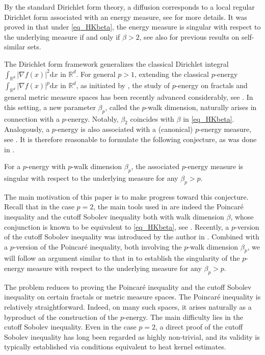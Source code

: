 \documentclass[11pt,a4paper]{article}
\numberwithin{equation}{section}
\theoremstyle{plain}
\theoremstyle{definition}
\begin{document}
By the standard Dirichlet form theory, a diffusion corresponds to a local regular Dirichlet form associated with an energy measure, see \cite{FOT11} for more details. It was proved in \cite{KM20} that under \ref{eq_HKbeta}, the energy measure is singular with respect to the underlying measure if and only if $\beta>2$, see also \cite{Kus89,Kus93LNM,BST99,Hin05,HN06} for previous results on self-similar sets.

The Dirichlet form framework generalizes the classical Dirichlet integral $\int_{\mathbb{R}^d}|\nabla f(x)|^2\mathrm{d} x$ in $\mathbb{R}^d$. For general $p>1$, extending the classical $p$-energy $\int_{\mathbb{R}^d}|\nabla f(x)|^p\mathrm{d} x$ in $\mathbb{R}^d$, as initiated by \cite{HPS04}, the study of $p$-energy on fractals and general metric measure spaces has been recently advanced considerably, see \cite{CGQ22,Shi24,BC23,MS25,Kig23,CGYZ26,AB25,AES25a}. In this setting, a new parameter $\beta_p$, called the $p$-walk dimension, naturally arises in connection with a $p$-energy. Notably, $\beta_2$ coincides with $\beta$ in \ref{eq_HKbeta}. Analogously, a $p$-energy is also associated with a (canonical) $p$-energy measure, see \cite{Sas26}. It is therefore reasonable to formulate the following conjecture, as was done in \cite[Problem 10.5]{MS25}.

\vspace{5pt}
 For a $p$-energy with $p$-walk dimension $\beta_p$, the associated $p$-energy measure is singular with respect to the underlying measure for any $\beta_p>p$.
\vspace{5pt}

The main motivation of this paper is to make progress toward this conjecture. Recall that in the case $p=2$, the main tools used in \cite{KM20} are indeed the Poincar\'e inequality and the cutoff Sobolev inequality both with walk dimension $\beta$, whose conjunction is known to be equivalent to \ref{eq_HKbeta}, see \cite{GHL15}. Recently, a $p$-version of the cutoff Sobolev inequality was introduced by the author in \cite{Yan25a}. Combined with a $p$-version of the Poincar\'e inequality, both involving the $p$-walk dimension $\beta_p$, we will follow an argument similar to that in \cite{KM20} to establish the singularity of the $p$-energy measure with respect to the underlying measure for any $\beta_p>p$.

The problem reduces to proving the Poincar\'e inequality and the cutoff Sobolev inequality on certain fractals or metric measure spaces. The Poincar\'e inequality is relatively straightforward. Indeed, on many such spaces, it arises naturally as a byproduct of the construction of the $p$-energy. The main difficulty lies in the cutoff Sobolev inequality. Even in the case $p=2$, a direct proof of the cutoff Sobolev inequality has long been regarded as highly non-trivial, and its validity is typically established via conditions equivalent to heat kernel estimates.
\end{document}

